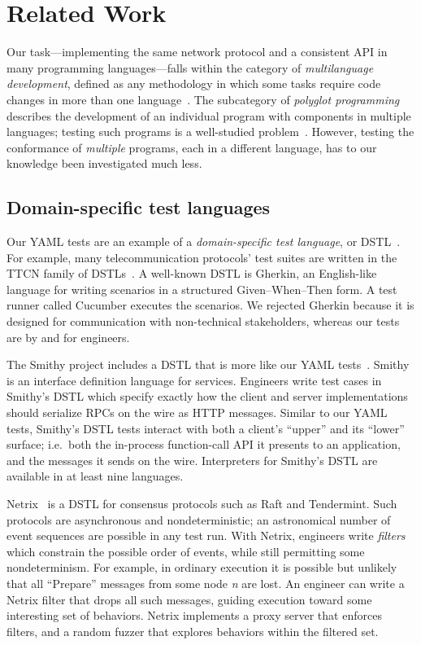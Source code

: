 \documentclass[conference]{IEEEtran}
\begin{document}
\section{Related Work}

Our task---implementing the same network protocol and a consistent API in many programming languages---falls within the category of \textit{multilanguage development}, defined as any methodology in which some tasks require code changes in more than one language~\cite{mussbacher_polyglot_2024}. The subcategory of \textit{polyglot programming} describes the development of an individual program with components in multiple languages; testing such programs is a well-studied problem~\cite{houdaille_polyglot_2024,yang_multi-language_2024}. However, testing the conformance of \textit{multiple} programs, each in a different language, has to our knowledge been investigated much less.

\subsection{Domain-specific test languages}

Our YAML tests are an example of a \textit{domain-specific test language}, or DSTL~\cite{felicio_rapitest_2023,da_silva_test_2019,dragoi_domain_2023,ye_automated_2021,smithy_authors_http_nodate}. For example, many telecommunication protocols' test suites are written in the TTCN family of DSTLs~\cite{grabowski_design_2000}. A well-known DSTL is Gherkin, an English-like language for writing scenarios in a structured Given--When--Then form. A test runner called Cucumber executes the scenarios. We rejected Gherkin because it is designed for communication with non-technical stakeholders, whereas our tests are by and for engineers.

The Smithy project includes a DSTL that is more like our YAML tests~\cite{smithy_authors_http_nodate}. Smithy is an interface definition language for services. Engineers write test cases in Smithy's DSTL which specify exactly how the client and server implementations should serialize RPCs on the wire as HTTP messages. Similar to our YAML tests, Smithy's DSTL tests interact with both a client's ``upper'' and its ``lower'' surface; i.e.\ both the in-process function-call API it presents to an application, and the messages it sends on the wire. Interpreters for Smithy's DSTL are available in at least nine languages.

Netrix~\cite{dragoi_domain_2023} is a DSTL for consensus protocols such as Raft and Tendermint. Such protocols are asynchronous and nondeterministic; an astronomical number of event sequences are possible in any test run. With Netrix, engineers write \textit{filters} which constrain the possible order of events, while still permitting some nondeterminism. For example, in ordinary execution it is possible but unlikely that all ``Prepare'' messages from some node \textit{n} are lost. An engineer can write a Netrix filter that drops all such messages, guiding execution toward some interesting set of behaviors. Netrix implements a proxy server that enforces filters, and a random fuzzer that explores behaviors within the filtered set.
\end{document}
